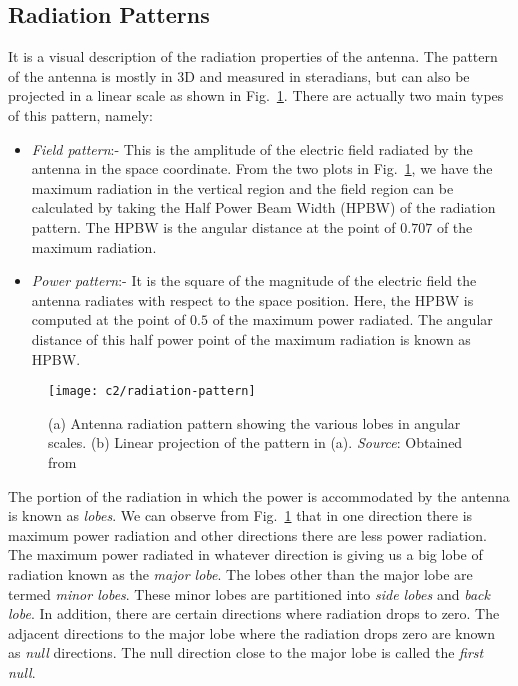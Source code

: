 \subsection{Radiation Patterns}	   \label{chap2:RadiationPattern}
%
It is a visual description of the radiation properties of the antenna. The pattern of the antenna is mostly in 3D and measured in steradians, but 
can also be projected in a linear scale as shown in Fig.~\ref{fig:radiation-pattern}.  There are actually two main types of this pattern, namely:
 \begin{itemize}[noitemsep]
  \item \emph{Field pattern}:- This is the amplitude of the electric field radiated by the antenna in the space coordinate. From the two plots  in Fig.~\ref{fig:radiation-pattern}, we have the maximum radiation in the vertical region and the field region can be calculated by taking the Half Power Beam Width (HPBW) of the radiation pattern. The HPBW is the angular distance at the point of $0.707$ of the maximum radiation.
  \item \emph{Power pattern}:- It is the square of the magnitude of the electric field the antenna radiates with respect to the space position. Here, the HPBW is computed at the point of $0.5$ of the maximum power radiated. The angular distance of this half power point of the maximum radiation is known as HPBW.
 \end{itemize}
%
\begin{figure}[H] %
	    \centering	
	    \texttt{[image: c2/radiation-pattern]}
	    \caption{(a) Antenna radiation pattern showing the various lobes in angular scales.  (b) Linear projection of the pattern in (a).
	            \emph{Source}: Obtained from \citep[pg. 30]{Balanis2005}}
	    \label{fig:radiation-pattern}
       \end{figure}
  \FloatBarrier   
The portion of the radiation in which the power is accommodated by the antenna is known as \emph{lobes}. We can observe from Fig.~\ref{fig:radiation-pattern} that in one
direction there is maximum power radiation and other directions there are less power radiation. The maximum power radiated in whatever direction is giving us a big lobe
of radiation known as the  \emph{major lobe}. The lobes other than the major lobe are termed  \emph{minor lobes}. These minor lobes are partitioned into \emph{side lobes} 
and \emph{back lobe}. In addition, there are certain directions where radiation drops to zero. The adjacent directions to the major lobe where the radiation drops zero
are known as \emph{null} directions. The null direction close to the major lobe is called the \emph{first null}.

